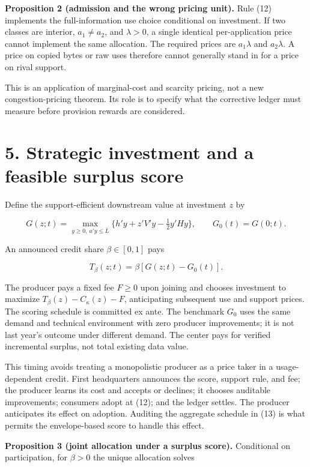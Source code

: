 \documentclass[
  11pt,
]{article}
\begin{document}
\textbf{Proposition 2 (admission and the wrong pricing unit).} Rule (12)
implements the full-information use choice conditional on investment. If
two classes are interior, \(a_1\ne a_2\), and \(\lambda>0\), a single
identical per-application price cannot implement the same allocation.
The required prices are \(a_1\lambda\) and \(a_2\lambda\). A price on
copied bytes or raw uses therefore cannot generally stand in for a price
on rival support.

This is an application of marginal-cost and scarcity pricing, not a new
congestion-pricing theorem. Its role is to specify what the corrective
ledger must measure before provision rewards are considered.

\section{5. Strategic investment and a feasible surplus
score}\label{strategic-investment-and-a-feasible-surplus-score}

Define the support-efficient downstream value at investment \(z\) by

\[G(z;t)=\max_{y\geq0,\ a'y\leq\bar L}
\{h'y+z'V'y-\tfrac12y'Hy\},\qquad G_0(t)=G(0;t). \tag{13}\]

An announced credit share \(\beta\in[0,1]\) pays

\[T_\beta(z;t)=\beta[G(z;t)-G_0(t)]. \tag{14}\]

The producer pays a fixed fee \(F\geq0\) upon joining and chooses
investment to maximize \(T_\beta(z)-C_\kappa(z)-F\), anticipating
subsequent use and support prices. The scoring schedule is committed ex
ante. The benchmark \(G_0\) uses the same demand and technical
environment with zero producer improvements; it is not last year's
outcome under different demand. The center pays for verified incremental
surplus, not total existing data value.

This timing avoids treating a monopolistic producer as a price taker in
a usage-dependent credit. First headquarters announces the score,
support rule, and fee; the producer learns its cost and accepts or
declines; it chooses auditable improvements; consumers adopt at (12);
and the ledger settles. The producer anticipates its effect on adoption.
Auditing the aggregate schedule in (13) is what permits the
envelope-based score to handle this effect.

\textbf{Proposition 3 (joint allocation under a surplus score).}
Conditional on participation, for \(\beta>0\) the unique allocation
solves
\end{document}

